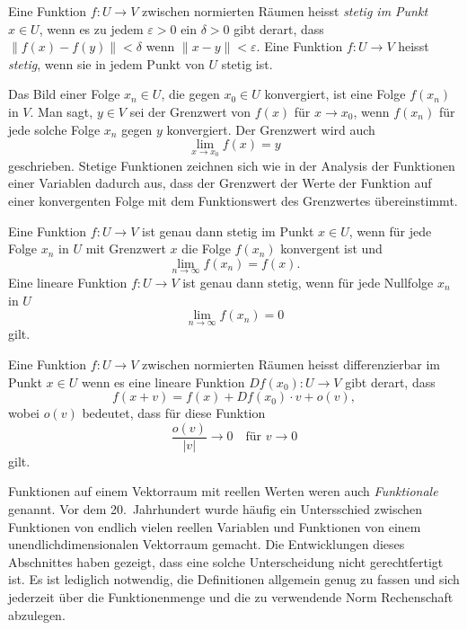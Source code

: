\begin{definition}[Stetigkeit]
Eine Funktion $f\colon U\to V$ zwischen normierten Räumen heisst
{\em stetig im Punkt} $x\in U$, wenn es zu jedem $\varepsilon > 0$
%
ein $\delta > 0$
gibt derart, dass
\(
\|f(x)-f(y)\| < \delta
\)
wenn
\(
\|x-y\|<\varepsilon
\).
Eine Funktion $f\colon U\to V$ heisst {\em stetig}, wenn sie in
jedem Punkt von $U$ stetig ist.
\end{definition}

Das Bild einer Folge $x_n\in U$, die gegen $x_0\in U$ konvergiert,
ist eine Folge $f(x_n)$ in $V$.
Man sagt, $y\in V$ sei der Grenzwert von $f(x)$ für $x\to x_0$,
wenn $f(x_n)$ für jede solche Folge $x_n$ gegen $y$ konvergiert.
Der Grenzwert wird auch
\[
\lim_{x\to x_0} f(x)
=
y
\]
geschrieben.
Stetige Funktionen zeichnen sich wie in der Analysis der Funktionen
einer Variablen dadurch aus, dass der Grenzwert der Werte der Funktion
auf einer konvergenten Folge mit dem Funktionswert des Grenzwertes
übereinstimmt.

\begin{satz}
Eine Funktion $f\colon U\to V$ ist genau dann stetig im Punkt $x\in U$,
wenn für jede Folge $x_n$ in $U$ mit Grenzwert $x$ die Folge $f(x_n)$
konvergent ist und
\[
\lim_{n\to\infty} f(x_n) = f(x).
\]
Eine lineare Funktion $f\colon U\to V$ ist genau dann stetig,
wenn für jede Nullfolge $x_n$ in $U$ 
\[
\lim_{n\to \infty} f(x_n) = 0
\]
gilt.
\end{satz}

\begin{definition}
Eine Funktion $f\colon U\to V$ zwischen normierten Räumen heisst
differenzierbar im Punkt $x\in U$ wenn es eine lineare Funktion
$Df(x_0)\colon U\to V$ gibt derart, dass
\[
f(x+v) =f(x) + Df(x_0)\cdot v + o(v),
\]
wobei $o(v)$ bedeutet, dass für diese Funktion
\[
\frac{o(v)}{|v|}\to 0
\quad\text{für $v\to 0$}
\]
gilt.
\end{definition}

Funktionen auf einem Vektorraum mit reellen Werten weren auch
{\em Funktionale} genannt.
Vor dem 20.~Jahrhundert wurde häufig ein Untersschied zwischen
Funktionen von endlich vielen reellen Variablen und Funktionen
von einem unendlichdimensionalen Vektorraum gemacht.
Die Entwicklungen dieses  Abschnittes haben gezeigt, dass eine
solche Unterscheidung nicht gerechtfertigt ist.
Es ist lediglich notwendig, die Definitionen allgemein genug zu
fassen und sich jederzeit über die Funktionenmenge und die zu
verwendende Norm Rechenschaft abzulegen.

